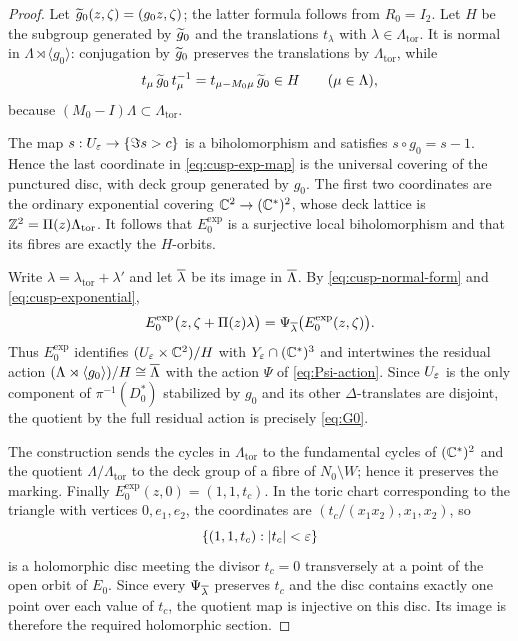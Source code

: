\begin{proof}
Let $\widetilde g_0(z,\zeta)=(g_0z,\zeta)$; the latter
formula follows from $R_0=I_2$.  Let $H$ be the subgroup generated by
$\widetilde g_0$ and the translations $t_\lambda$ with
$\lambda\in\Lambda_{\mathrm{tor}}$.  It is normal in
$\Lambda\rtimes\langle g_0\rangle$: conjugation by $\widetilde g_0$ preserves
the translations by $\Lambda_{\mathrm{tor}}$, while
\[
 t_\mu\,\widetilde g_0\,t_\mu^{-1}
 =t_{\mu-M_0\mu}\,\widetilde g_0\in H
 \qquad(\mu\in\Lambda),
\]
because $(M_0-I)\Lambda\subset\Lambda_{\mathrm{tor}}$.

The map $s:U_\varepsilon\to\{\Im s>c\}$ is a biholomorphism and satisfies
$s\circ g_0=s-1$.  Hence the last coordinate in
\eqref{eq:cusp-exp-map} is the universal covering of the punctured disc,
with deck group generated by $g_0$.  The first two coordinates are the
ordinary exponential covering $\mathbb C^2\to(\mathbb C^*)^2$, whose deck lattice is
$\mathbb Z^2=\Pi(z)\Lambda_{\mathrm{tor}}$.  It follows that
$E_0^{\exp}$ is a surjective local biholomorphism and that its fibres are
exactly the $H$-orbits.

Write $\lambda=\lambda_{\mathrm{tor}}+\lambda'$ and let
$\overline\lambda$ be its image in $\overline\Lambda$.  By
\eqref{eq:cusp-normal-form} and \eqref{eq:cusp-exponential},
\[
 E_0^{\exp}\bigl(z,\zeta+\Pi(z)\lambda\bigr)
 =\Psi_{\overline\lambda}\bigl(E_0^{\exp}(z,\zeta)\bigr).
\]
Thus $E_0^{\exp}$ identifies $(U_\varepsilon\times\mathbb C^2)/H$ with
$Y_\varepsilon\cap(\mathbb C^*)^3$ and intertwines the residual action
$(\Lambda\rtimes\langle g_0\rangle)/H\cong\overline\Lambda$ with the action
$\Psi$ of \eqref{eq:Psi-action}.  Since $U_\varepsilon$ is the only component of
$\pi^{-1}(D_0^*)$ stabilized by $g_0$ and its other $\Delta$-translates
are disjoint, the quotient by the full residual action is precisely
\eqref{eq:G0}.

The construction sends the cycles in $\Lambda_{\mathrm{tor}}$ to the
fundamental cycles of $(\mathbb C^*)^2$ and the quotient
$\Lambda/\Lambda_{\mathrm{tor}}$ to the deck group of a fibre of
$N_0\setminus W$; hence it preserves the marking.  Finally
$E_0^{\exp}(z,0)=(1,1,t_c)$.  In the toric chart corresponding to the
triangle with vertices $0,e_1,e_2$, the coordinates are
$(t_c/(x_1x_2),x_1,x_2)$, so
\[
 \{(1,1,t_c):|t_c|<\varepsilon\}
\]
is a holomorphic disc meeting the divisor $t_c=0$ transversely at a point
of the open orbit of $E_0$.  Since every $\Psi_{\overline\lambda}$ preserves $t_c$ and the disc contains
exactly one point over each value of $t_c$, the quotient map is injective
on this disc.  Its image is therefore the required holomorphic section.
\end{proof}


